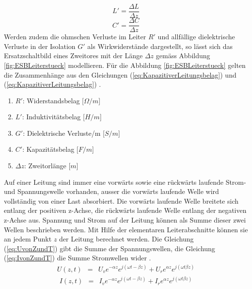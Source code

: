 \begin{equation}
L'=\dfrac{\Delta L}{\Delta z}\label{eq:InduktiverLeitungsbelag}
\end{equation}
\begin{equation}
C'=\dfrac{\Delta C}{\Delta z}\label{eq:KapazitiverLeitungsbelag}
\end{equation}
Werden zudem die ohmschen Verluste im Leiter $R'$ und allfällige dielektrische Verluste in der Isolation $G'$ als Wirkwiderstände dargestellt, so lässt sich das Ersatzschaltbild eines Zweitores mit der Länge $\Delta z$ gemäss Abbildung \ref{fig:ESBLeiterstueck} modellieren.
Für die Abbildung \ref{fig:ESBLeiterstueck} gelten die Zusammenhänge aus den Gleichungen (\ref{eq:KapazitiverLeitungsbelag}) und  (\ref{eq:KapazitiverLeitungsbelag}) \cite{Tekom}.
\begin{enumerate}[leftmargin=2cm]
   \item[] $R'$: Widerstandsbelag [$\Omega/m$] 
   \item[] $L'$: Induktivitätsbelag  [$H/m$] 
   \item[] $G'$: Dielektrische Verluste/m  [$S/m$] 
   \item[] $C'$: Kapazitätsbelag [$F/m$] 
   \item[] $\Delta z$: Zweitorlänge [$m$] 
\end{enumerate} 
Auf einer Leitung sind immer eine vorwärts sowie  eine rückwärts laufende Strom- und Spannungswelle vorhanden, ausser die vorwärts laufende Welle wird vollständig von einer Last absorbiert. Die vorwärts laufende Welle breitete sich entlang der positiven z-Achse, die rückwärts laufende Welle entlang der negativen z-Achse aus. Spannung und Strom auf der Leitung können als Summe dieser zwei Wellen beschrieben werden. Mit Hilfe der elementaren Leiterabschnitte können sie an jedem Punkt $z$ der Leitung berechnet werden. Die Gleichung (\ref{eq:UvonZundT}) gibt die Summe der Spannungswellen, die Gleichung (\ref{eq:IvonZundT}) die Summe Stromwellen wider \cite{Tekom}.
\begin{eqnarray}\label{eq:UvonZundT}
U(z,t) &=& U_{v}e^{-\alpha z}e^{j(\omega t -\beta z)}+U_{r}e^{\alpha z}e^{j(\omega t \beta z)}
\end{eqnarray}
\begin{eqnarray}\label{eq:IvonZundT}
I(z,t) &=& I_{v}e^{-\alpha z}e^{j(\omega t -\beta z)}+I_{r}e^{\alpha z}e^{j(\omega t \beta z)}
\end{eqnarray}

